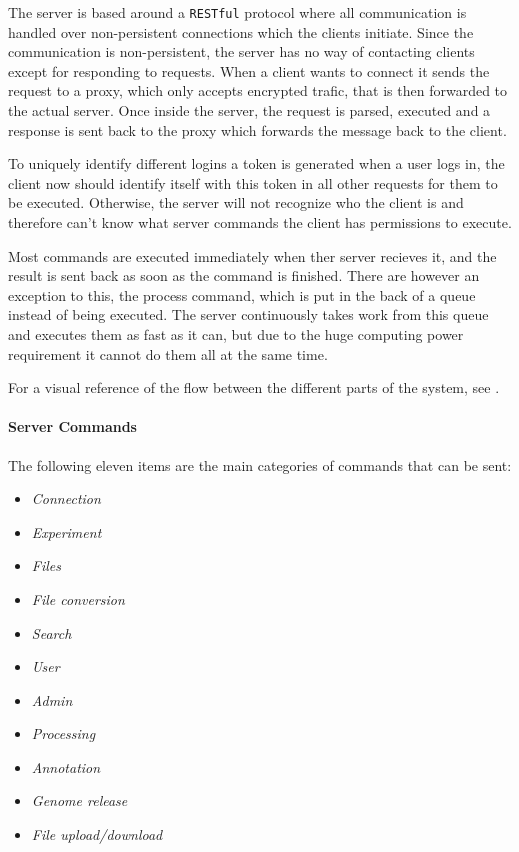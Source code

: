 
\label{chap:com_systemdesign}
The server is based around a \texttt{RESTful} protocol where all communication is handled over non-persistent connections which the clients initiate. Since the communication is non-persistent, the server has no way of contacting clients except for responding to requests. When a client wants to connect it sends the request to a proxy, which only accepts encrypted trafic, that is then forwarded to the actual server. Once inside the server, the request is parsed, executed and a response is sent back to the proxy which forwards the message back to the client. 

To uniquely identify different logins a token is generated when a user logs in, the client now should identify itself with this token in all other requests for them to be executed. Otherwise, the server will not recognize who the client
is and therefore can't know what server commands the client has permissions to execute. 

Most commands are executed immediately when ther server recieves it, and the result is sent back as soon as the command is finished. There are however an exception to this, the process command, which is put in the back of a queue instead of being executed. The server continuously takes work from this queue and executes them as fast as it can, but due to the huge computing power requirement it cannot do them all at the same time. 

For a visual reference of the flow between the different parts of the system, see .

\paragraph*{Server Commands}

The following eleven items are the main categories of commands that can be sent: 

\begin{itemize}
	\item \textit{Connection}
	\item \textit{Experiment}
	\item \textit{Files}
	\item \textit{File conversion}
	\item \textit{Search}
	\item \textit{User}
	\item \textit{Admin}
	\item \textit{Processing}
	\item \textit{Annotation}
	\item \textit{Genome release}
	\item \textit{File upload/download}
\end{itemize}

